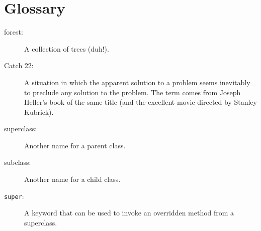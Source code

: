 \section{Glossary}

\begin{description}

\item[forest:] A collection of trees (duh!).

\item[Catch 22:] A situation in which the apparent solution to
a problem seems inevitably to preclude any solution to the problem.
The term comes from Joseph Heller's book of the same title (and
the excellent movie directed by Stanley Kubrick).


\item[superclass:] Another name for a parent class.

\item[subclass:] Another name for a child class.

\item[{\tt super}:] A keyword that can be used to invoke an overridden
method from a superclass.

\end{description}


